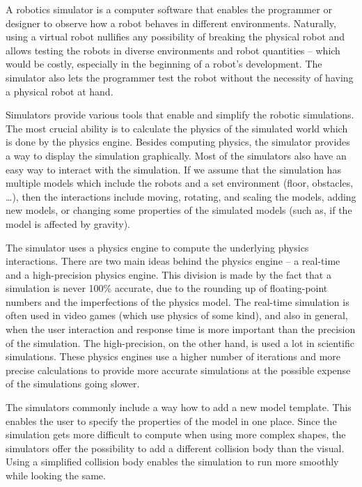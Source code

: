 \documentclass[
  printed, %
  color,   %
  notable, %
  oneside, %
  nolof,   %
  nolot,   %
  nocover,
]{fithesis3}
\begin{document}
A robotics simulator is a computer software that enables the programmer or designer to observe how a robot behaves in different environments.
Naturally, using a virtual robot nullifies any possibility of breaking the physical robot and allows testing the robots in diverse environments and robot quantities -- which would be costly, especially in the beginning of a robot's development.
The simulator also lets the programmer test the robot without the necessity of having a physical robot at hand.

Simulators provide various tools that enable and simplify the robotic simulations.
The most crucial ability is to calculate the physics of the simulated world which is done by the physics engine.
Besides computing physics, the simulator provides a way to display the simulation graphically.
Most of the simulators also have an easy way to interact with the simulation.
If we assume that the simulation has multiple models which include the robots and a set environment (floor, obstacles, \ldots), then the interactions include moving, rotating, and scaling the models, adding new models, or changing some properties of the simulated models (such as, if the model is affected by gravity).

The simulator uses a physics engine to compute the underlying physics interactions.
There are two main ideas behind the physics engine -- a real-time and a high-precision physics engine.
This division is made by the fact that a simulation is never 100\% accurate, due to the rounding up of floating-point numbers and the imperfections of the physics model.
The real-time simulation is often used in video games (which use physics of some kind), and also in general, when the user interaction and response time is more important than the precision of the simulation.
The high-precision, on the other hand, is used a lot in scientific simulations.
These physics engines use a higher number of iterations and more precise calculations to provide more accurate simulations at the possible expense of the simulations going slower.

The simulators commonly include a way how to add a new model template.
This enables the user to specify the properties of the model in one place.
Since the simulation gets more difficult to compute when using more complex shapes, the simulators offer the possibility to add a different collision body than the visual.
Using a simplified collision body enables the simulation to run more smoothly while looking the same.
\end{document}
